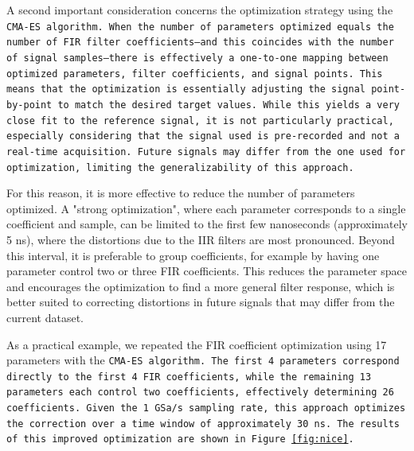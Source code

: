A second important consideration concerns the optimization strategy using the \tt{CMA-ES} algorithm. 
When the number of parameters optimized equals the number of FIR filter coefficients—and this coincides with the number of signal samples—there is effectively a one-to-one mapping between optimized parameters, filter coefficients, and signal points. 
This means that the optimization is essentially adjusting the signal point-by-point to match the desired target values. 
While this yields a very close fit to the reference signal, it is not particularly practical, especially considering that the signal used is pre-recorded and not a real-time acquisition. 
Future signals may differ from the one used for optimization, limiting the generalizability of this approach.

For this reason, it is more effective to reduce the number of parameters optimized. 
A "strong optimization", where each parameter corresponds to a single coefficient and sample, can be limited to the first few nanoseconds (approximately 5 ns), where the distortions due to the IIR filters are most pronounced. 
Beyond this interval, it is preferable to group coefficients, for example by having one parameter control two or three FIR coefficients. 
This reduces the parameter space and encourages the optimization to find a more general filter response, which is better suited to correcting distortions in future signals that may differ from the current dataset.

As a practical example, we repeated the FIR coefficient optimization using 17 parameters with the \tt{CMA-ES} algorithm. 
The first 4 parameters correspond directly to the first 4 FIR coefficients, while the remaining 13 parameters each control two coefficients, effectively determining 26 coefficients. 
Given the 1 GSa/s sampling rate, this approach optimizes the correction over a time window of approximately 30 ns. 
The results of this improved optimization are shown in Figure \ref{fig:nice}.

